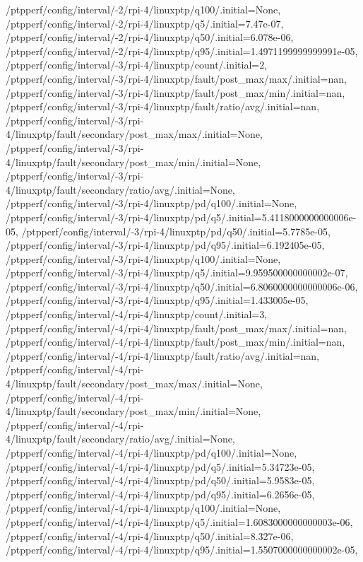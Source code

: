 {    /ptpperf/config/interval/-2/rpi-4/linuxptp/q100/.initial=None,
    /ptpperf/config/interval/-2/rpi-4/linuxptp/q5/.initial=7.47e-07,
    /ptpperf/config/interval/-2/rpi-4/linuxptp/q50/.initial=6.078e-06,
    /ptpperf/config/interval/-2/rpi-4/linuxptp/q95/.initial=1.4971199999999991e-05,
    /ptpperf/config/interval/-3/rpi-4/linuxptp/count/.initial=2,
    /ptpperf/config/interval/-3/rpi-4/linuxptp/fault/post_max/max/.initial=nan,
    /ptpperf/config/interval/-3/rpi-4/linuxptp/fault/post_max/min/.initial=nan,
    /ptpperf/config/interval/-3/rpi-4/linuxptp/fault/ratio/avg/.initial=nan,
    /ptpperf/config/interval/-3/rpi-4/linuxptp/fault/secondary/post_max/max/.initial=None,
    /ptpperf/config/interval/-3/rpi-4/linuxptp/fault/secondary/post_max/min/.initial=None,
    /ptpperf/config/interval/-3/rpi-4/linuxptp/fault/secondary/ratio/avg/.initial=None,
    /ptpperf/config/interval/-3/rpi-4/linuxptp/pd/q100/.initial=None,
    /ptpperf/config/interval/-3/rpi-4/linuxptp/pd/q5/.initial=5.4118000000000006e-05,
    /ptpperf/config/interval/-3/rpi-4/linuxptp/pd/q50/.initial=5.7785e-05,
    /ptpperf/config/interval/-3/rpi-4/linuxptp/pd/q95/.initial=6.192405e-05,
    /ptpperf/config/interval/-3/rpi-4/linuxptp/q100/.initial=None,
    /ptpperf/config/interval/-3/rpi-4/linuxptp/q5/.initial=9.959500000000002e-07,
    /ptpperf/config/interval/-3/rpi-4/linuxptp/q50/.initial=6.8060000000000006e-06,
    /ptpperf/config/interval/-3/rpi-4/linuxptp/q95/.initial=1.433005e-05,
    /ptpperf/config/interval/-4/rpi-4/linuxptp/count/.initial=3,
    /ptpperf/config/interval/-4/rpi-4/linuxptp/fault/post_max/max/.initial=nan,
    /ptpperf/config/interval/-4/rpi-4/linuxptp/fault/post_max/min/.initial=nan,
    /ptpperf/config/interval/-4/rpi-4/linuxptp/fault/ratio/avg/.initial=nan,
    /ptpperf/config/interval/-4/rpi-4/linuxptp/fault/secondary/post_max/max/.initial=None,
    /ptpperf/config/interval/-4/rpi-4/linuxptp/fault/secondary/post_max/min/.initial=None,
    /ptpperf/config/interval/-4/rpi-4/linuxptp/fault/secondary/ratio/avg/.initial=None,
    /ptpperf/config/interval/-4/rpi-4/linuxptp/pd/q100/.initial=None,
    /ptpperf/config/interval/-4/rpi-4/linuxptp/pd/q5/.initial=5.34723e-05,
    /ptpperf/config/interval/-4/rpi-4/linuxptp/pd/q50/.initial=5.9583e-05,
    /ptpperf/config/interval/-4/rpi-4/linuxptp/pd/q95/.initial=6.2656e-05,
    /ptpperf/config/interval/-4/rpi-4/linuxptp/q100/.initial=None,
    /ptpperf/config/interval/-4/rpi-4/linuxptp/q5/.initial=1.6083000000000003e-06,
    /ptpperf/config/interval/-4/rpi-4/linuxptp/q50/.initial=8.327e-06,
    /ptpperf/config/interval/-4/rpi-4/linuxptp/q95/.initial=1.5507000000000002e-05,
}
